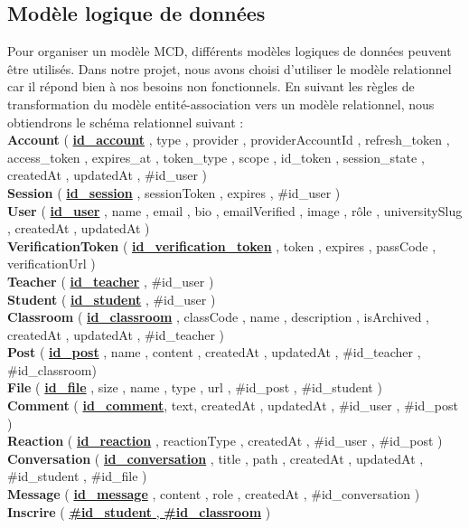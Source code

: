 \subsection{Modèle logique de données}
Pour organiser un modèle MCD, différents modèles logiques de données peuvent être utilisés. Dans notre projet, nous avons choisi d'utiliser le modèle relationnel car il répond bien à nos besoins non fonctionnels. En suivant les règles de transformation du modèle entité-association vers un modèle relationnel, nous obtiendrons le schéma relationnel suivant : \\
\textbf{Account} ( \textbf{\uline{id\_account}} , type , provider , providerAccountId , refresh\_token , access\_token , expires\_at , token\_type , scope , id\_token , session\_state , createdAt , updatedAt , \#id\_user ) \\
\textbf{Session} ( \textbf{\uline{id\_session}} , sessionToken , expires , \#id\_user ) \\ 
\textbf{User} ( \textbf{\uline{id\_user}} , name , email , bio , emailVerified , image , rôle , universitySlug , createdAt , updatedAt ) \\
\textbf{VerificationToken} ( \textbf{\uline{id\_verification\_token}} , token , expires , passCode , verificationUrl ) \\
\textbf{Teacher} ( \textbf{\uline{id\_teacher}} , \#id\_user ) \\
\textbf{Student} ( \textbf{\uline{id\_student}} , \#id\_user ) \\
\textbf{Classroom} ( \textbf{\uline{id\_classroom}} , classCode , name , description , isArchived , createdAt , updatedAt , \#id\_teacher ) \\
\textbf{Post} ( \textbf{\uline{id\_post}} , name , content , createdAt , updatedAt , \#id\_teacher , \#id\_classroom) \\
\textbf{File} ( \textbf{\uline{id\_file}} , size , name , type , url , \#id\_post , \#id\_student ) \\
\textbf{Comment} ( \textbf{\uline{id\_comment}}, text, createdAt , updatedAt , \#id\_user , \#id\_post ) \\
\textbf{Reaction} ( \textbf{\uline{id\_reaction}} , reactionType , createdAt , \#id\_user , \#id\_post ) \\
\textbf{Conversation} ( \textbf{\uline{id\_conversation}} , title , path , createdAt , updatedAt , \#id\_student , \#id\_file ) \\
\textbf{Message} ( \textbf{\uline{id\_message}} , content , role , createdAt , \#id\_conversation ) \\
\textbf{Inscrire} ( \uline{\textbf{\#id\_student} , \textbf{\#id\_classroom}} )

